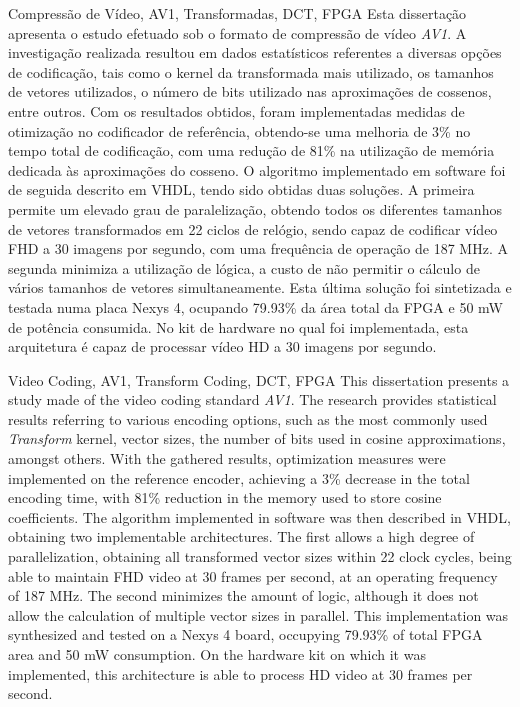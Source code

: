 \TitlePage
  \vspace*{55mm}
       {Compressão de Vídeo, AV1, Transformadas, DCT, FPGA}
       {Esta dissertação apresenta o estudo efetuado sob o formato de compressão de vídeo \emph{AV1}. A investigação realizada resultou em dados estatísticos referentes a diversas opções de codificação, tais como o kernel da transformada mais utilizado, os tamanhos de vetores utilizados, o número de bits utilizado nas aproximações de cossenos, entre outros. Com os resultados obtidos, foram implementadas medidas de otimização no codificador de referência, obtendo-se uma melhoria de 3\% no tempo total de codificação, com uma redução de 81\% na utilização de memória dedicada às aproximações do cosseno.}
  \TEXT{}
       {O algoritmo implementado em software foi de seguida descrito em VHDL, tendo sido obtidas duas soluções. A primeira permite um elevado grau de paralelização, obtendo todos os diferentes tamanhos de vetores transformados em 22 ciclos de relógio, sendo capaz de codificar vídeo FHD a 30 imagens por segundo, com uma frequência de operação de 187 MHz. A segunda minimiza a utilização de lógica, a custo de não permitir o cálculo de vários tamanhos de vetores simultaneamente. Esta última solução foi sintetizada e testada numa placa Nexys 4, ocupando 79.93\% da área total da FPGA e 50 mW de potência consumida. No kit de hardware no qual foi implementada, esta arquitetura é capaz de processar vídeo HD a 30 imagens por segundo.}
\EndTitlePage
\titlepage\ \endtitlepage %

\TitlePage
  \vspace*{55mm}
       {Video Coding, AV1, Transform Coding, DCT, FPGA}
       {This dissertation presents a study made of the video coding standard \emph{AV1}. The research provides statistical results referring to various encoding options, such as the most commonly used \emph{Transform} kernel, vector sizes, the number of bits used in cosine approximations, amongst others. With the gathered results, optimization measures were implemented on the reference encoder, achieving a 3\% decrease in the total encoding time, with 81\% reduction in the memory used to store cosine coefficients.}
  \TEXT{}
       {The algorithm implemented in software was then described in VHDL, obtaining two implementable architectures. The first allows a high degree of parallelization, obtaining all transformed vector sizes within 22 clock cycles, being able to maintain FHD video at 30 frames per second, at an operating frequency of 187 MHz. The second minimizes the amount of logic, although it does not allow the calculation of multiple vector sizes in parallel. This implementation was synthesized and tested on a Nexys 4 board, occupying 79.93\% of total FPGA area and 50 mW consumption. On the hardware kit on which it was implemented, this architecture is able to process HD video at 30 frames per second.}
\EndTitlePage
\titlepage\ \endtitlepage %
